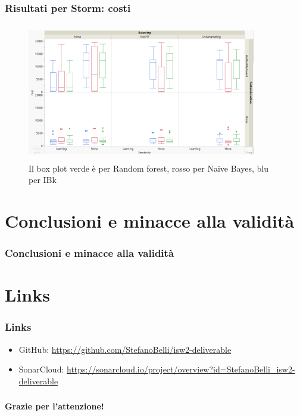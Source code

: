 \documentclass{beamer}
\begin{document}
\begin{frame}
	\frametitle{Risultati per Storm: costi}
	
	\centering
	\begin{figure}
	\includegraphics[width=10cm, height=6cm]{storm-cost}
	\caption{Il box plot verde è per Random forest, rosso per Naive Bayes, blu per IBk}
	\end{figure}
\end{frame}

\section{Conclusioni e minacce alla validità}
\begin{frame}
	\frametitle{Conclusioni e minacce alla validità}
	
\end{frame}

\section{Links}
\begin{frame}
	\frametitle{Links}
	
	\begin{itemize}
		\item GitHub: \url{https://github.com/StefanoBelli/isw2-deliverable}
		\item SonarCloud: \url{https://sonarcloud.io/project/overview?id=StefanoBelli_isw2-deliverable}
	\end{itemize}
	
\end{frame}

\begin{frame}
    \frametitle{}
    
    \fontsize{30pt}{10pt}\selectfont
    \centering
    \textbf{Grazie per l'attenzione!}
    
\end{frame}
\end{document}

